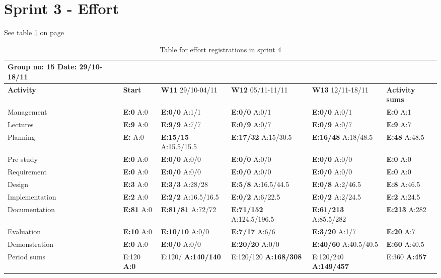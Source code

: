 \section{Sprint 3 - Effort}

See table \ref{tab:effortweekss4} on page \pageref{tab:effortweekss4}

\newpage

\begin{table}[htb]
\begin{tabularx}{\linewidth}{>{\setlength\hsize{.625\hsize}}X|>{\setlength\hsize{0.3\hsize}}X|>{\setlength\hsize{0.5\hsize}}X|>{\setlength\hsize{0.5\hsize}}X|>{\setlength\hsize{0.5\hsize}}X|>{\setlength\hsize{.3\hsize}}X}
Group no: 15 Date: 29/10-18/11  \\ \hline
\textbf{Activity} & \textbf{Start} & \textbf{W11} 29/10-04/11 & \textbf{W12} 05/11-11/11 & \textbf{W13} 12/11-18/11 & \textbf{Activity sums} \\ \hline \hline
Management & \textbf{E:0} A:0 & \textbf{E:0/0} A:1/1 & \textbf{E:0/0} A:0/1 & \textbf{E:0/0} A:0/1 & \textbf{E:0} A:1  \\ \hline
Lectures & \textbf{E:9} A:0 & \textbf{E:9/9} A:7/7 & \textbf{E:0/9} A:0/7 & \textbf{E:0/9} A:0/7 & \textbf{E:9} A:7  \\ \hline
Planning & \textbf{E:} A:0 & \textbf{E:15/15} A:15.5/15.5 & \textbf{E:17/32} A:15/30.5 & \textbf{E:16/48} A:18/48.5 & \textbf{E:48} A:48.5  \\ \hline
Pre study & \textbf{E:0} A:0 & \textbf{E:0/0} A:0/0 & \textbf{E:0/0} A:0/0 & \textbf{E:0/0} A:0/0 & \textbf{E:0} A:0  \\ \hline
Requirement & \textbf{E:0} A:0 & \textbf{E:0/0} A:0/0 & \textbf{E:0/0} A:0/0 & \textbf{E:0/0} A:0/0 & \textbf{E:0} A:0 \\ \hline
Design & \textbf{E:3} A:0 & \textbf{E:3/3} A:28/28 & \textbf{E:5/8} A:16.5/44.5 & \textbf{E:0/8} A:2/46.5 & \textbf{E:8} A:46.5  \\ \hline
Implementation & \textbf{E:2} A:0 & \textbf{E:2/2} A:16.5/16.5 & \textbf{E:0/2} A:6/22.5 & \textbf{E:0/2} A:2/24.5 & \textbf{E:2} A:24.5  \\ \hline
Documentation & \textbf{E:81} A:0 & \textbf{E:81/81} A:72/72 & \textbf{E:71/152} A:124.5/196.5 & \textbf{E:61/213} A:85.5/282 & \textbf{E:213} A:282  \\ \hline
Evaluation & \textbf{E:10} A:0 & \textbf{E:10/10} A:0/0 & \textbf{E:7/17} A:6/6 & \textbf{E:3/20} A:1/7 & \textbf{E:20 } A:7  \\ \hline
Demonstration & \textbf{E:0} A:0 & \textbf{E:0/0} A:0/0 & \textbf{E:20/20} A:0/0 & \textbf{E:40/60} A:40.5/40.5 & \textbf{E:60 } A:40.5  \\ \hline
Period sums & E:120 \textbf{A:0} & E:120/ \textbf{A:140/140} & E:120/120 \textbf{A:168/308} & E:120/240 \textbf{A:149/457} & E:360 \textbf{A:457} \\ \hline
\end{tabularx}

\caption{Table for effort registrations in sprint 4} \label{tab:effortweekss4}
\end{table}

